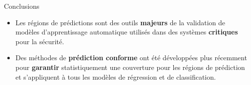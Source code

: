 \begin{frame}{Conclusions}
	\begin{itemize}
		\item Les régions de prédictions sont des outils \textbf{majeurs} de la validation de modèles d'apprentissage automatique utilisés dans des systèmes \textbf{critiques} pour la sécurité.
		\pause
		\item Des méthodes de \textbf{prédiction conforme} ont été développées plus récemment pour \textbf{garantir} statistiquement une couverture pour les régions de prédiction et s'appliquent à tous les modèles de régression et de classification.
	\end{itemize}
\end{frame}